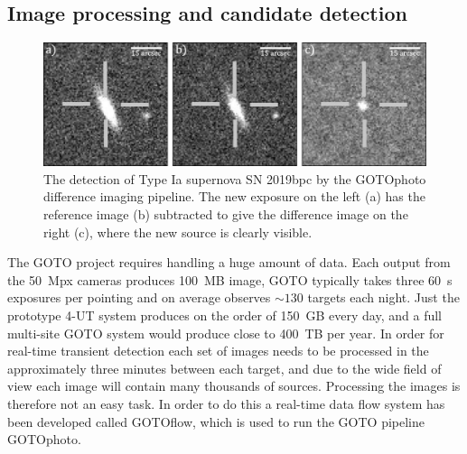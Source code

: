 \begin{colsection}
\begin{colsection}
\end{colsection}


\subsection{Image processing and candidate detection}
\label{sec:gotophoto}
\begin{colsection}

\begin{figure}[t]
    \begin{center}
        \includegraphics[width=\linewidth]{images/diffimg.pdf}
    \end{center}
    \caption[The detection of SN 2019bpc through difference imaging]{
        The detection of Type Ia supernova SN 2019bpc by the GOTOphoto difference imaging pipeline. The new exposure on the left (a) has the reference image (b) subtracted to give the difference image on the right (c), where the new source is clearly visible.
    }\label{fig:diffimg}
\end{figure}

The GOTO project requires handling a huge amount of data. Each output from the 50~Mpx cameras produces 100~MB image, GOTO typically takes three \SI{60}{\second} exposures per pointing and on average observes $\sim130$ targets each night. Just the prototype 4-UT system produces on the order of 150~GB every day, and a full multi-site GOTO system would produce close to 400~TB per year. In order for real-time transient detection each set of images needs to be processed in the approximately three minutes between each target, and due to the wide field of view each image will contain many thousands of sources. Processing the images is therefore not an easy task. In order to do this a real-time data flow system has been developed called GOTOflow, which is used to run the GOTO pipeline GOTOphoto.


\end{colsection}
\end{colsection}
